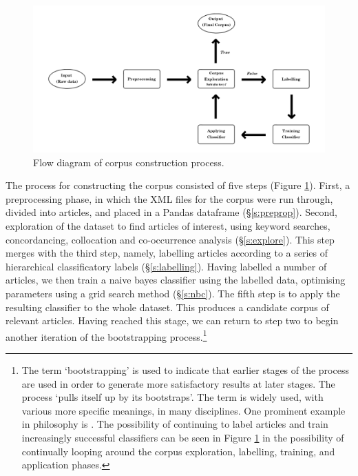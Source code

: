\documentclass{article}
\begin{document}
\begin{figure}
    \centering
    \includegraphics[width=\textwidth]{images/flow_diagram.png}
    \caption{Flow diagram of corpus construction process.}
    \label{f:flow}
\end{figure}

The process for constructing the corpus consisted of five steps (Figure \ref{f:flow}). First, a preprocessing phase, in which the XML files for the corpus were run through, divided into articles, and placed in a Pandas dataframe (\S \ref{s:preprop}). Second, exploration of the dataset to find articles of interest, using keyword searches, concordancing, collocation and co-occurrence analysis (\S \ref{s:explore}). This step merges with the third step, namely, labelling articles according to a series of hierarchical classificatory labels (\S \ref{s:labelling}). Having labelled a number of articles, we then train a naive bayes classifier using the labelled data, optimising parameters using a grid search method (\S \ref{s:nbc}). The fifth step is to apply the resulting classifier to the whole dataset. This produces a candidate corpus of relevant articles. Having reached this stage, we can return to step two to begin another iteration of the bootstrapping process.\footnote{
The term `bootstrapping' is used to indicate that earlier stages of the process are used in order to generate more satisfactory results at later stages. The process `pulls itself up by its bootstraps'. The term is widely used, with various more specific meanings, in many disciplines. One prominent example in philosophy is \cite{glymour}. The possibility of continuing to label articles and train increasingly successful classifiers can be seen in Figure \ref{f:flow} in the possibility of continually looping around the corpus exploration, labelling, training, and application phases.
}
\end{document}
